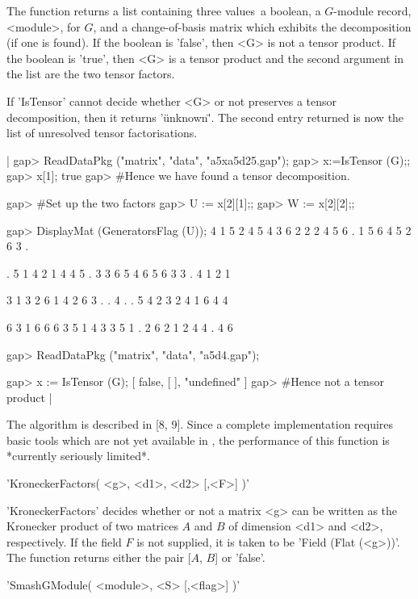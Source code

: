 The function  returns  a list  containing  three values\:\  a boolean,  a
$G$-module record, <module>, for $G$, and  a change-of-basis matrix which
exhibits the decomposition (if one is found).  If the boolean is 'false',
then <G> is not a tensor product.  If the  boolean is 'true', then <G> is
a tensor product  and the second argument in  the list are the two tensor
factors.

If  'IsTensor' cannot decide whether  <G>  or not preserves  a     tensor
decomposition,  then it returns  '\"unknown\"'. The second entry returned
is now the list of unresolved tensor factorisations.

|    gap> ReadDataPkg ("matrix", "data", "a5xa5d25.gap");
    gap> x:=IsTensor (G);;
    gap> x[1];
    true
    gap> #Hence we have found a tensor decomposition.

    gap> #Set up the two factors
    gap> U := x[2][1];;
    gap> W := x[2][2];;

    gap> DisplayMat (GeneratorsFlag (U));
     4 1 5 2 4
     5 4 3 6 2
     2 2 4 5 6
     . 1 5 6 4
     5 2 6 3 .

     . 5 1 4 2
     1 4 4 5 .
     3 3 6 5 4
     6 5 6 3 3
     . 4 1 2 1

     3 1 3 2 6
     1 4 2 6 3
     . . 4 . .
     5 4 2 3 2
     4 1 6 4 4

     6 3 1 6 6
     6 3 5 1 4
     3 3 5 1 .
     2 6 2 1 2
     4 4 . 4 6

    gap> ReadDataPkg ("matrix", "data", "a5d4.gap");

    gap> x := IsTensor (G);
    [ false, [  ], "undefined" ]
    gap> #Hence not a tensor product |

The algorithm is described in  [8,  9].  Since a complete  implementation
requires basic  tools  which  are  not yet    available in  {\GAP},   the
performance of this function is *currently seriously limited*.


'KroneckerFactors( <g>, <d1>, <d2> [,<F>] )'

'KroneckerFactors' decides whether or not a matrix  <g> can be written as
the Kronecker product of  two matrices $A$ and $B$  of dimension <d1> and
<d2>, respectively.  If the field $F$ is not supplied,  it is taken to be
'Field (Flat (<g>))'.  The function returns either the pair [$A$, $B$] or
'false'.


'SmashGModule( <module>, <S> [,<flag>] )'

